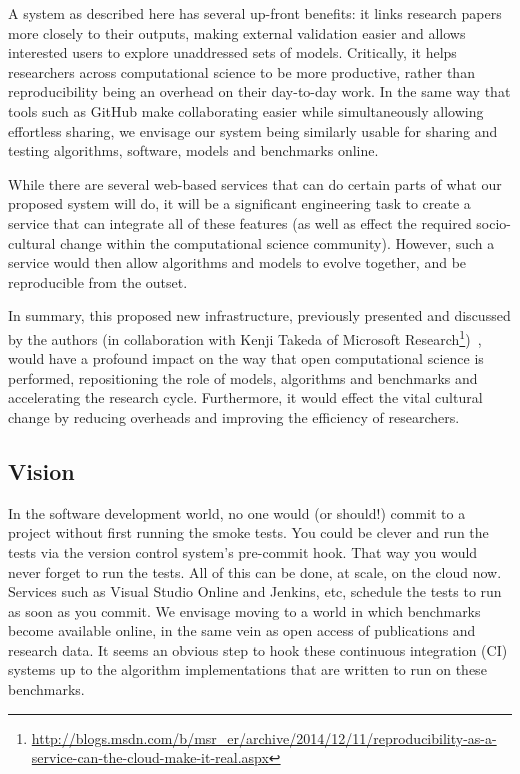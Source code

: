 \documentclass[a4paper,10pt]{article}
\begin{document}
A system as described here has several up-front benefits: it links
research papers more closely to their outputs, making external
validation easier and allows interested users to explore unaddressed
sets of models. Critically, it helps researchers across computational
science to be more productive, rather than reproducibility being an
overhead on their day-to-day work. In the same way that tools such as
GitHub make collaborating easier while simultaneously allowing
effortless sharing, we envisage our system being similarly usable for
sharing and testing algorithms, software, models and benchmarks
online.

While there are several web-based services that can do certain parts
of what our proposed system will do, it will be a significant
engineering task to create a service that can integrate all of these
features (as well as effect the required socio-cultural change within
the computational science community). However, such a service would
then allow algorithms and models to evolve together, and be
reproducible from the outset.

In summary, this proposed new infrastructure, previously presented and
discussed by the authors (in collaboration with Kenji Takeda of
Microsoft
Research\footnote{\url{http://blogs.msdn.com/b/msr_er/archive/2014/12/11/reproducibility-as-a-service-can-the-cloud-make-it-real.aspx}})~\cite{crick-et-al_wssspe2,crick-et-al_recomp2014},
would have a profound impact on the way that open computational
science is performed, repositioning the role of models, algorithms and
benchmarks and accelerating the research cycle. Furthermore, it would
effect the vital cultural change by reducing overheads and improving
the efficiency of researchers.

\subsection*{Vision}

In the software development world, no one would (or should!) commit to
a project without first running the smoke tests. You could be clever
and run the tests via the version control system's pre-commit
hook. That way you would never forget to run the tests. All of this
can be done, at scale, on the cloud now. Services such as Visual
Studio Online and Jenkins, etc, schedule the tests to run as soon as
you commit. We envisage moving to a world in which benchmarks become
available online, in the same vein as open access of publications and
research data. It seems an obvious step to hook these continuous
integration (CI) systems up to the algorithm implementations that are
written to run on these benchmarks.
\end{document}

